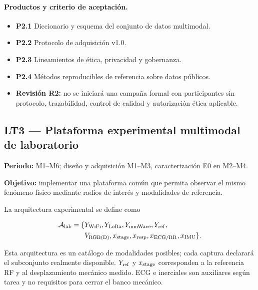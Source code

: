 \paragraph{Productos y criterio de aceptación.}
\begin{itemize}
    \item \textbf{P2.1} Diccionario y esquema del conjunto de datos multimodal.
    \item \textbf{P2.2} Protocolo de adquisición v1.0.
    \item \textbf{P2.3} Lineamientos de ética, privacidad y gobernanza.
    \item \textbf{P2.4} Métodos reproducibles de referencia sobre datos públicos.
    \item \textbf{Revisión R2:} no se iniciará una campaña formal con participantes sin
    protocolo, trazabilidad, control de calidad y autorización ética aplicable.
\end{itemize}

\subsection{LT3 --- Plataforma experimental multimodal de laboratorio}
\label{sec:wp3_stage1}

\textbf{Periodo:} M1--M6; diseño y adquisición M1--M3, caracterización E0 en M2--M4.

\textbf{Objetivo:} implementar una plataforma común que permita observar el mismo
fenómeno físico mediante radios de interés y modalidades de referencia.

La arquitectura experimental se define como

\begin{equation}
\begin{aligned}
\mathcal A_{\rm lab}=\{&Y_{\rm WiFi},Y_{\rm LoRa},Y_{\rm mmWave},Y_{\rm ref},\\
&V_{\rm RGB(D)},x_{\rm stage},x_{\rm resp},x_{\rm ECG/RR},x_{\rm IMU}\}.
\end{aligned}
\label{eq:lab_architecture}
\end{equation}

Esta arquitectura es un catálogo de modalidades posibles; cada captura declarará el
subconjunto realmente disponible. $Y_{\rm ref}$ y $x_{\rm stage}$ corresponden a la
referencia RF y al desplazamiento mecánico medido. ECG e inerciales son auxiliares
según tarea y no requisitos para cerrar el banco mecánico.

